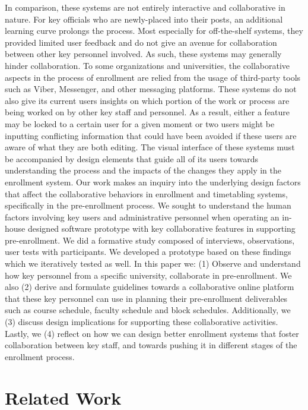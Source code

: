 In comparison, these systems are not entirely interactive and collaborative in nature. For key officials who are newly-placed into their posts, an additional learning curve prolongs the process. Most especially for off-the-shelf systems, they provided limited user feedback and do not give an avenue for collaboration between other key personnel involved. As such, these systems may generally hinder collaboration. To some organizations and universities, the collaborative aspects in the process of enrollment are relied from the usage of third-party tools such as Viber, Messenger, and other messaging platforms. These systems do not also give its current users insights on which portion of the work or process are being worked on by other key staff and personnel. As a result, either a feature may be locked to a certain user for a given moment or two users might be inputting conflicting information that could have been avoided if these users are aware of what they are both editing. The visual interface of these systems must be accompanied by design elements that guide all of its users towards understanding the process and the impacts of the changes they apply in the enrollment system. Our work makes an inquiry into the underlying design factors that affect the collaborative behaviors in enrollment and timetabling systems, specifically in the pre-enrollment process. We sought to understand the human factors involving key users and administrative personnel when operating an in-house designed software prototype with key collaborative features in supporting pre-enrollment. We did a formative study composed of interviews, observations, user tests with participants. We developed a prototype based on these findings which we iteratively tested as well. In this paper we: (1) Observe and understand how key personnel from a specific university, collaborate in pre-enrollment. We also (2) derive and formulate guidelines towards a collaborative online platform that these key personnel can use in planning their pre-enrollment deliverables such as course schedule, faculty schedule and block schedules. Additionally, we (3) discuss design implications for supporting these collaborative activities. Lastly, we (4) reflect on how we can design better enrollment systems that foster collaboration between key staff, and towards pushing it in different stages of the enrollment process. 

\section{Related Work}
